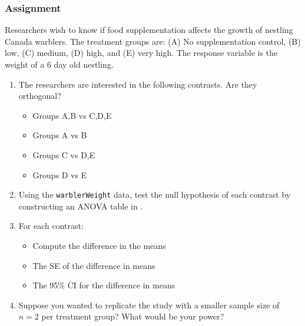 \documentclass[color=usenames,dvipsnames]{beamer}\usepackage[]{graphicx}\usepackage[]{color}
\begin{document}
\begin{frame}
  \frametitle{Assignment}
  \footnotesize
  Researchers wish to know if food supplementation affects the growth
  of nestling Canada warblers. The treatment groups are: (A) No
  supplementation control, (B) low, (C) medium, (D) high, and (E) very
  high. The response variable is the weight of a 6 day old nestling.
  \begin{enumerate}[\bf (1)]
    \footnotesize
    \item<1-> The researchers are interested in the following
      contrasts. Are they orthogonal?
    \begin{itemize}
    \footnotesize
      \item Groups A,B vs C,D,E
      \item Groups A vs B
      \item Groups C vs D,E
      \item Groups D vs E
    \end{itemize}
    \item<2-> Using the {\tt warblerWeight} data, test the null
      hypothesis of each contrast by constructing an ANOVA table
       in \R.
    \item<3-> For each contrast:
      \begin{itemize}
        \footnotesize
        \item Compute the difference in the means
        \item The SE of the difference in means
        \item The 95\% CI for the difference in means
      \end{itemize}
    \item<4-> Suppose you wanted to replicate the study with a
      smaller sample size of $n=2$ per treatment group? What would be
      your power?
  \end{enumerate}
  \uncover<5->{
    \centering
    Submit a
    self-contained script (or .Rmd file) before your
    next lab.\\
  }

\end{frame}
\end{document}
